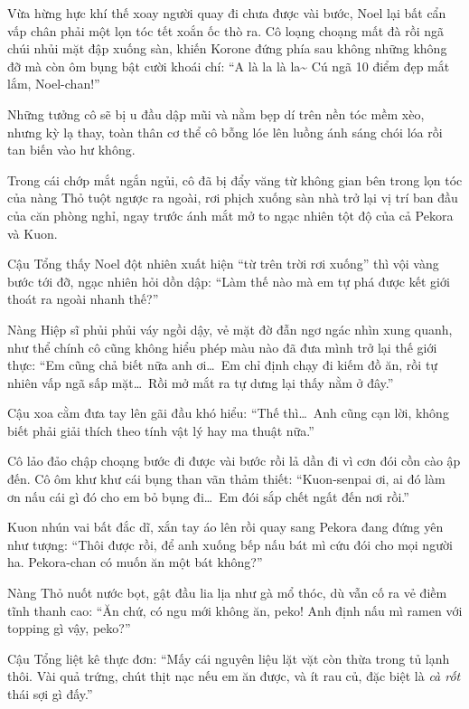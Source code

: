 \documentclass[../main.tex]{subfiles}
\begin{document}
Vừa hừng hực khí thế xoay người quay đi chưa được vài bước, Noel lại bất cẩn vấp chân phải một lọn tóc tết xoắn ốc thò ra. Cô loạng choạng mất đà rồi ngã chúi nhủi mặt đập xuống sàn, khiến Korone đứng phía sau không những không đỡ mà còn ôm bụng bật cười khoái chí: ``A là la là la\~{} Cú ngã 10 điểm đẹp mắt lắm, Noel-chan!''


Những tưởng cô sẽ bị u đầu dập mũi và nằm bẹp dí trên nền tóc mềm xèo, nhưng kỳ lạ thay, toàn thân cơ thể cô bỗng lóe lên luồng ánh sáng chói lóa rồi tan biến vào hư không.

Trong cái chớp mắt ngắn ngủi, cô đã bị đẩy văng từ không gian bên trong lọn tóc của nàng Thỏ tuột ngược ra ngoài, rơi phịch xuống sàn nhà trở lại vị trí ban đầu của căn phòng nghỉ, ngay trước ánh mắt mở to ngạc nhiên tột độ của cả Pekora và Kuon.

Cậu Tổng thấy Noel đột nhiên xuất hiện ``từ trên trời rơi xuống'' thì vội vàng bước tới đỡ, ngạc nhiên hỏi dồn dập: ``Làm thế nào mà em tự phá được kết giới thoát ra ngoài nhanh thế?''

Nàng Hiệp sĩ phủi phủi váy ngồi dậy, vẻ mặt đờ đẫn ngơ ngác nhìn xung quanh, như thể chính cô cũng không hiểu phép màu nào đã đưa mình trở lại thế giới thực: ``Em cũng chả biết nữa anh ơi\dots\ Em chỉ định chạy đi kiếm đồ ăn, rồi tự nhiên vấp ngã sấp mặt\dots\ Rồi mở mắt ra tự dưng lại thấy nằm ở đây.''

Cậu xoa cằm đưa tay lên gãi đầu khó hiểu: ``Thế thì\dots\ Anh cũng cạn lời, không biết phải giải thích theo tính vật lý hay ma thuật nữa.''

Cô lảo đảo chập choạng bước đi được vài bước rồi lả dần đi vì cơn đói cồn cào ập đến. Cô ôm khư khư cái bụng than vãn thảm thiết: ``Kuon-senpai ơi, ai đó làm ơn nấu cái gì đó cho em bỏ bụng đi\dots\ Em đói sắp chết ngất đến nơi rồi.''

Kuon nhún vai bất đắc dĩ, xắn tay áo lên rồi quay sang Pekora đang đứng yên như tượng: ``Thôi được rồi, để anh xuống bếp nấu bát mì cứu đói cho mọi người ha. Pekora-chan có muốn ăn một bát không?''

Nàng Thỏ nuốt nước bọt, gật đầu lia lịa như gà mổ thóc, dù vẫn cố ra vẻ điềm tĩnh thanh cao: ``Ăn chứ, có ngu mới không ăn, peko! Anh định nấu mì ramen với topping gì vậy, peko?''

Cậu Tổng liệt kê thực đơn: ``Mấy cái nguyên liệu lặt vặt còn thừa trong tủ lạnh thôi. Vài quả trứng, chút thịt nạc nếu em ăn được, và ít rau củ, đặc biệt là \emph{cà rốt} thái sợi gì đấy.''
\end{document}
